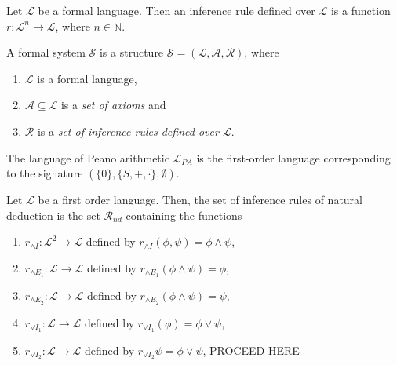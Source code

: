 \begin{definition}
    Let $\mathcal{L}$ be a formal language. Then an inference rule defined over $\mathcal{L}$ is a function $r : \mathcal{L}^n \to \mathcal{L}$, where $n \in \mathbb{N}$.
\end{definition}

\begin{definition}
    A formal system $\mathcal{S}$ is a structure $\mathcal{S} = (\mathcal{L}, \mathcal{A}, \mathcal{R})$, where 
    \begin{enumerate}
        \item $\mathcal{L}$ is a formal language,
        \item $\mathcal{A} \subseteq \mathcal{L}$ is a \textit{set of axioms} and 
        \item $\mathcal{R}$ is a \textit{set of inference rules defined over $\mathcal{L}$}.
    \end{enumerate}
\end{definition}

\begin{definition}
    The language of Peano arithmetic $\mathcal{L}_{PA}$ is the first-order language corresponding to the signature $(\{0\},\{S,+,\cdot\},\emptyset)$.
\end{definition}

\begin{definition}
    Let $\mathcal{L}$ be a first order language. Then, the set of inference rules of natural deduction is the set $\mathcal{R}_{nd}$ containing the functions 
    \begin{enumerate}
        \item $r_{\land I} : \mathcal{L}^2 \to \mathcal{L}$ defined by $r_{\land I}(\phi,\psi) = \phi \land \psi$,
        \item $r_{\land E_1} : \mathcal{L} \to \mathcal{L}$ defined by $r_{\land E_1}(\phi \land \psi) = \phi$,
        \item $r_{\land E_2} : \mathcal{L} \to \mathcal{L}$ defined by $r_{\land E_2}(\phi \land \psi) = \psi$,
        \item $r_{\lor I_1} : \mathcal{L} \to \mathcal{L}$ defined by $r_{\lor I_1}(\phi) = \phi \lor \psi$,
        \item $r_{\lor I_2} : \mathcal{L} \to \mathcal{L}$ defined by $r_{\lor I_2}{\psi} = \phi \lor \psi$,
        PROCEED HERE
    \end{enumerate}
\end{definition}


